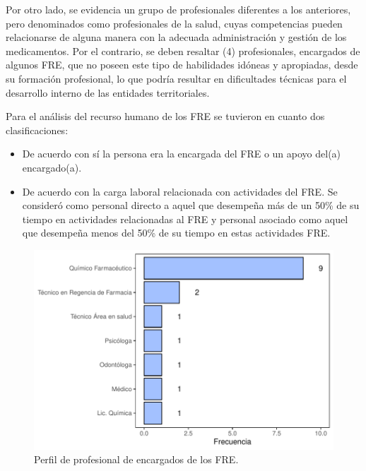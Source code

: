 \documentclass[
  oneside]{book}
\begin{document}
Por otro lado, se evidencia un grupo de profesionales diferentes a los anteriores, pero denominados como profesionales de la salud, cuyas competencias pueden relacionarse de alguna manera con la adecuada administración y gestión de los medicamentos. Por el contrario, se deben resaltar (4) profesionales, encargados de algunos FRE, que no poseen este tipo de habilidades idóneas y apropiadas, desde su formación profesional, lo que podría resultar en dificultades técnicas para el desarrollo interno de las entidades territoriales.

Para el análisis del recurso humano de los FRE se tuvieron en cuanto dos clasificaciones:

\begin{itemize}
\item
  De acuerdo con sí la persona era la encargada del FRE o un apoyo del(a) encargado(a).
\item
  De acuerdo con la carga laboral relacionada con actividades del FRE. Se consideró como personal directo a aquel que desempeña más de un 50\% de su tiempo en actividades relacionadas al FRE y personal asociado como aquel que desempeña menos del 50\% de su tiempo en estas actividades FRE.
\end{itemize}

\begin{figure}[t!]

{\centering \includegraphics[width=1\linewidth]{InformeFinal_files/figure-latex/perfilProfesionalEncargado-1} 

}

\caption{Perfil de profesional de encargados de los FRE.}\label{fig:perfilProfesionalEncargado}
\end{figure}
\end{document}
